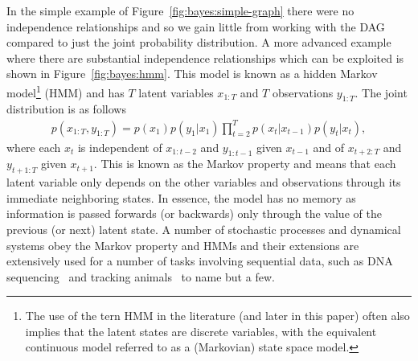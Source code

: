 In the simple example of Figure~\ref{fig:bayes:simple-graph} there were no independence relationships and so
we gain little from working with the DAG compared to just the joint probability distribution.
A more advanced example where there are substantial independence relationships which can
be exploited is shown in Figure~\ref{fig:bayes:hmm}.
  This model is known as a hidden Markov 
model\footnote{The use of the tern HMM in the literature (and later in this paper) often also implies that
	the latent states are discrete variables, with the equivalent continuous model referred to as a
	(Markovian) state space model.} (HMM)
and has $T$ latent variables $x_{1:T}$ and $T$ observations $y_{1:T}$.  The joint distribution is as follows
\begin{align}
\label{eq:bayes:hmm}
p(x_{1:T},y_{1:T}) = p(x_1) p(y_1|x_1)\prod_{t=2}^{T} p(x_t|x_{t-1})p(y_t|x_t),
\end{align}
where each $x_t$ is
independent of $x_{1:{t-2}}$ and $y_{1:t-1}$ given $x_{t-1}$ and of $x_{t+2:T}$ and $y_{{t+1}:T}$ given $x_{t+1}$.
This is known as the Markov property and means that each latent variable only depends on the other
variables and observations through its immediate neighboring states.  In essence, the model has no memory as information
is passed forwards (or backwards) only through the value of the previous (or next) latent state.  A number of stochastic
processes and dynamical systems obey the Markov property and HMMs and their extensions are extensively used for
a number of tasks involving sequential data, such as DNA sequencing~\citep{durbin1998biological} and tracking
animals~\citep{dhir2016tracking,dhir2017interpreting} to name but a few. 

